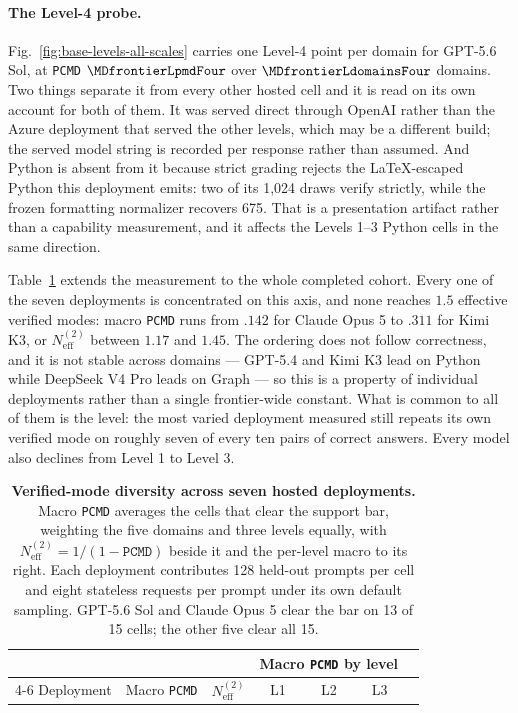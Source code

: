 \documentclass{article}
\newcommand{\1}{\mathbf 1}
\newcommand{\pmd}{\texttt{PCMD}}
\newcommand{\neff}{\ensuremath{N^{(2)}_{\mathrm{eff}}}}
\theoremstyle{remark}
\theoremstyle{definition}
\theoremstyle{plain}
\begin{document}
\paragraph{The Level-4 probe.}
Fig.~\ref{fig:base-levels-all-scales} carries one Level-4 point per domain for
GPT-5.6 Sol, at \pmd{} $\MDfrontierLpmdFour$ over $\MDfrontierLdomainsFour$
domains. Two things separate it from every other hosted cell and it is read
on its own account for both of them. It was
served direct through OpenAI rather than the Azure deployment that served the
other levels, which may be a different build; the served model string is
recorded per response rather than assumed. And Python is absent from it because
strict grading rejects the LaTeX-escaped Python this deployment emits: two of
its 1,024 draws verify strictly, while the frozen formatting normalizer
recovers 675. That is a presentation artifact rather than a capability
measurement, and it affects the Levels 1--3 Python cells in the same direction.

Table~\ref{tab:hosted-cohort-mode-diversity} extends the measurement to the
whole completed cohort. Every one of the seven deployments is concentrated on
this axis, and none reaches $1.5$ effective verified modes: macro \pmd{} runs
from $.142$ for Claude Opus 5 to $.311$ for Kimi K3, or $\neff$ between $1.17$
and $1.45$. The ordering does not follow correctness, and it is not stable
across domains --- GPT-5.4 and Kimi K3 lead on Python while DeepSeek V4 Pro
leads on Graph --- so this is a property of individual deployments rather than
a single frontier-wide constant. What is common to all of them is the level:
the most varied deployment measured still repeats its own verified mode on
roughly seven of every ten pairs of correct answers. Every model also declines
from Level 1 to Level 3.

\begin{table}[!htbp]
  \centering
  \caption{\textbf{Verified-mode diversity across seven hosted deployments.}
  Macro \pmd{} averages the cells that clear the support bar, weighting the
  five domains and three levels equally, with $\neff=1/(1-\pmd{})$ beside it
  and the per-level macro to its right. Each deployment contributes 128
  held-out prompts per cell and eight stateless requests per prompt under its
  own default sampling. GPT-5.6 Sol and Claude Opus 5 clear the bar on 13 of
  15 cells; the other five clear all 15.}
  \label{tab:hosted-cohort-mode-diversity}
  \small
  \begin{tabular}{lcccccc}
    \toprule
    & & & \multicolumn{3}{c}{Macro \pmd{} by level} \\
    \cmidrule(lr){4-6}
    Deployment & Macro \pmd{} & $\neff$ & L1 & L2 & L3 \\
    \midrule
    
  \end{tabular}
\end{table}
\end{document}
